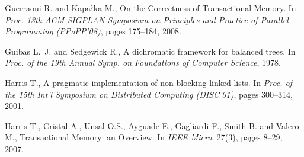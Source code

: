 \begin{thebibliography}{99}
{
Guerraoui R. and Kapa\l{}ka M., 
On the Correctness of Transactional Memory. 
In {\it Proc. 13th ACM SIGPLAN Symposium on Principles and Practice of 
Parallel Programming (PPoPP'08)}, pages 175--184, 2008. 






Guibas L.~J.  and Sedgewick R.,
\newblock A dichromatic framework for balanced trees.
\newblock In {\em Proc. of the 19th Annual Symp. on Foundations of Computer
  Science}, 1978.


Harris T.,
\newblock A pragmatic implementation of non-blocking linked-lists.
\newblock In {\em Proc. of the 15th Int'l Symposium on Distributed Computing (DISC'01)}, pages 300--314, 2001.






Harris T., Cristal  A., Unsal O.S., Ayguade E., Gagliardi  F., Smith B. and
Valero M., 
Transactional Memory: an Overview. 
In {\it IEEE Micro}, 27(3), pages 8--29, 2007. 


% 
% 



}
\end{thebibliography}
